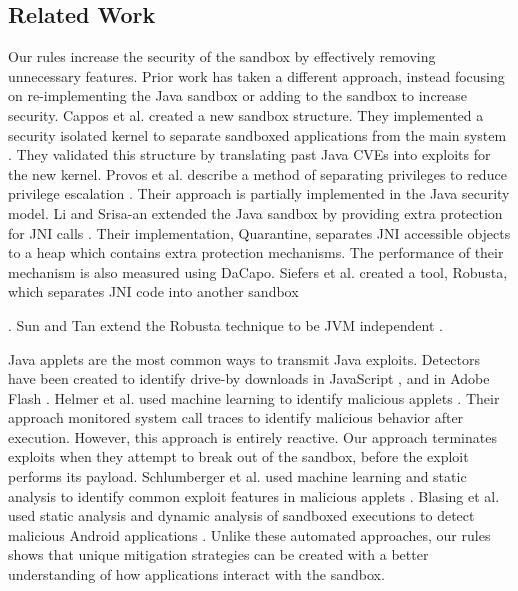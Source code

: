 \documentclass{sig-alternate}
\begin{document}
\subsection{Related Work}\label{sub:Related-Work-Mitigation}

Our rules increase the security of the sandbox
by effectively removing unnecessary features. Prior work has taken a different
approach, instead focusing on re-implementing the Java sandbox or
adding to the sandbox to increase security. Cappos et al. created
a new sandbox structure. They implemented a security isolated kernel
to separate sandboxed applications from the main system \cite{cappos_retaining_2010}.
They validated this structure by translating past Java CVEs into exploits
for the new kernel. Provos et al. describe a method of separating
privileges to reduce privilege escalation \cite{Provos-PrivilegeEscalation}.
Their approach is partially implemented in the Java security model.
Li and Srisa-an extended the Java sandbox by providing extra protection
for JNI calls \cite{li_quarantine:_2011}. Their implementation, Quarantine,
separates JNI accessible objects to a heap which contains extra protection
mechanisms. The performance of their mechanism is also measured using
DaCapo. Siefers et al. created a tool, Robusta, which separates JNI
code into another sandbox \cite{siefers_robusta:_2010}%

. Sun and Tan extend the Robusta technique to be JVM independent \cite{sun_jvm-portable_2012}. 

Java applets are the most common ways to transmit Java exploits. Detectors
have been created to identify drive-by downloads in JavaScript \cite{cova_detection_2010},
and in Adobe Flash \cite{ford_analyzing_2009}. Helmer et al. used
machine learning to identify malicious applets \cite{helmer_anomalous_2001}.
Their approach monitored system call traces to identify malicious
behavior after execution. However, this approach is entirely reactive.
Our approach terminates exploits when they attempt to break out of
the sandbox, before the exploit performs its payload. Schlumberger
et al. used machine learning and static analysis to identify common
exploit features in malicious applets \cite{schlumberger_jarhead_2012}.
Blasing et al. used static analysis and dynamic analysis of sandboxed
executions to detect malicious Android applications \cite{Blasing-AndriodSandbox}.
Unlike these automated approaches, our rules shows that unique
mitigation strategies can be created with a better understanding of
how applications interact with the sandbox. 
\end{document}
